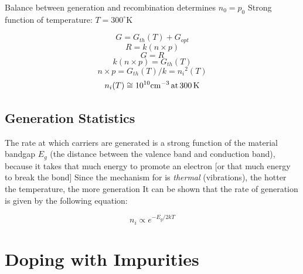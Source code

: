   
 Balance between generation and recombination determines $n_0 =  p_0 $
 Strong function of temperature:  $T = 300^\circ$K
 


\begin{equation} G = {G_{th}}(T) + {G_{opt}} \end{equation}
\begin{equation} R = k(n \times p) \end{equation}
\begin{equation} G = R \end{equation}
\begin{equation} k(n \times p) = {G_{th}}(T) \end{equation}
\begin{equation} n \times p = {G_{th}}(T)/k = {n_i}^2(T) \end{equation}
\begin{equation} {n_i}(T) \cong {10^{10}}{\rm{c}}{{\rm{m}}^{ - 3}}\,{\rm{at}}\,300\,{\rm{K}}
\end{equation}





\subsection{Generation Statistics}


  
 The rate at which carriers are generated is a strong function of the material bandgap $E_g$ (the distance between the valence band and conduction band), because it takes that much energy to promote an electron [or that much energy to break the bond]
 Since the mechanism for is \textit{thermal} (vibrations), the hotter the temperature, the more generation
 It can be shown that the rate of generation is given by the following equation:

\begin{equation}
	n_i \propto e^{-E_g/2kT}
\end{equation}
 






\section{Doping with Impurities}










